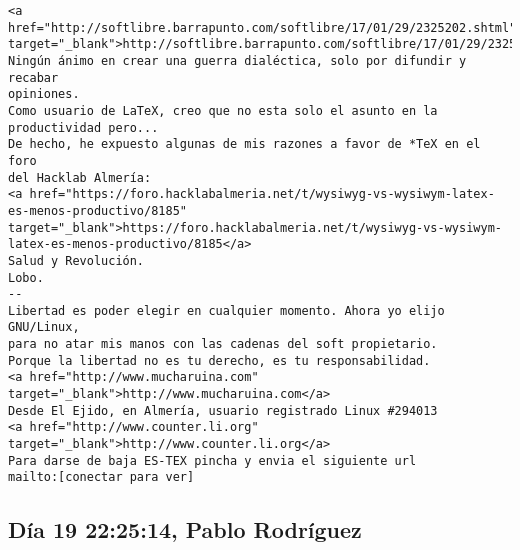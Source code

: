 \documentclass[a4paper,10pt]{article}
\begin{document}
\begin{lstlisting}
<a href="http://softlibre.barrapunto.com/softlibre/17/01/29/2325202.shtml" target="_blank">http://softlibre.barrapunto.com/softlibre/17/01/29/2325202.shtml</a>
Ningún ánimo en crear una guerra dialéctica, solo por difundir y recabar
opiniones.
Como usuario de LaTeX, creo que no esta solo el asunto en la
productividad pero...
De hecho, he expuesto algunas de mis razones a favor de *TeX en el foro
del Hacklab Almería:
<a href="https://foro.hacklabalmeria.net/t/wysiwyg-vs-wysiwym-latex-es-menos-productivo/8185" target="_blank">https://foro.hacklabalmeria.net/t/wysiwyg-vs-wysiwym-latex-es-menos-productivo/8185</a>
Salud y Revolución.
Lobo.
-- 
Libertad es poder elegir en cualquier momento. Ahora yo elijo GNU/Linux,
para no atar mis manos con las cadenas del soft propietario.
Porque la libertad no es tu derecho, es tu responsabilidad.
<a href="http://www.mucharuina.com" target="_blank">http://www.mucharuina.com</a>
Desde El Ejido, en Almería, usuario registrado Linux #294013
<a href="http://www.counter.li.org" target="_blank">http://www.counter.li.org</a>
Para darse de baja ES-TEX pincha y envia el siguiente url
mailto:[conectar para ver]

\end{lstlisting}

\subsection{Día 19 22:25:14, Pablo Rodríguez}
\end{document}
